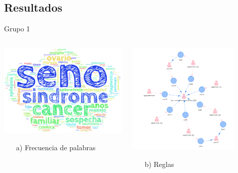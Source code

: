 \documentclass[xcolor=dvipsnames]{beamer}
\begin{document}
\subsection{Resultados}

\begin{frame}{Grupo 1}
\begin{columns}
\begin{column}{0.5\textwidth}
\begin{center}
\includegraphics[width=1\textwidth]{cluster1} \\
\begin{itemize}
    \item[a)] Frecuencia de palabras
\end{itemize}
\end{center}
\end{column}
\begin{column}{0.5\textwidth}  %
    \begin{center}
     \includegraphics[width=0.8\textwidth]{reglas1_2.png}
    \begin{itemize}
    \centering
    \item[b)] Reglas
    \end{itemize}
    \end{center}
\end{column}
\end{columns}
\end{frame}
\end{document}
